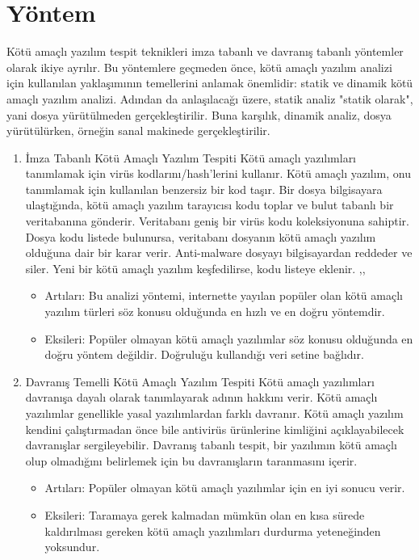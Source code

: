 \documentclass{article}
\begin{document}
\section{Yöntem}
Kötü amaçlı yazılım tespit teknikleri imza tabanlı ve davranış tabanlı yöntemler olarak ikiye ayrılır. Bu yöntemlere geçmeden önce, kötü amaçlı yazılım analizi için kullanılan yaklaşımının temellerini anlamak önemlidir: statik ve dinamik kötü amaçlı yazılım analizi. Adından da anlaşılacağı üzere, statik analiz "statik olarak", yani dosya yürütülmeden gerçekleştirilir. Buna karşılık, dinamik analiz, dosya yürütülürken, örneğin sanal makinede  gerçekleştirilir.
\begin{enumerate}
\item İmza Tabanlı Kötü Amaçlı Yazılım Tespiti
Kötü amaçlı yazılımları tanımlamak için virüs kodlarını/hash'lerini kullanır. Kötü amaçlı yazılım, onu tanımlamak için kullanılan benzersiz bir kod taşır. Bir dosya bilgisayara ulaştığında, kötü amaçlı yazılım tarayıcısı kodu toplar ve bulut tabanlı bir veritabanına gönderir. Veritabanı geniş bir virüs kodu koleksiyonuna sahiptir. Dosya kodu listede bulunursa, veritabanı dosyanın kötü amaçlı yazılım olduğuna dair bir karar verir. Anti-malware dosyayı bilgisayardan reddeder ve siler. Yeni bir kötü amaçlı yazılım keşfedilirse, kodu listeye eklenir.
,,
\begin{itemize}
\item Artıları:
 Bu analizi yöntemi, internette yayılan popüler olan kötü amaçlı yazılım türleri söz konusu olduğunda en hızlı ve en doğru yöntemdir.
\item Eksileri:
Popüler olmayan kötü amaçlı yazılımlar söz konusu olduğunda en doğru yöntem değildir. Doğruluğu kullandığı veri setine bağlıdır.
\end{itemize}
\item Davranış Temelli Kötü Amaçlı Yazılım Tespiti
Kötü amaçlı yazılımları davranışa dayalı olarak tanımlayarak adının hakkını verir. Kötü amaçlı yazılımlar genellikle yasal yazılımlardan farklı davranır. Kötü amaçlı yazılım kendini çalıştırmadan önce bile antivirüs ürünlerine kimliğini açıklayabilecek davranışlar sergileyebilir. Davranış tabanlı tespit, bir yazılımın kötü amaçlı olup olmadığını belirlemek için bu davranışların taranmasını içerir\cite{met1}.
\begin{itemize}
\item Artıları:
Popüler olmayan kötü amaçlı yazılımlar için en iyi sonucu verir.
\item Eksileri:
Taramaya gerek kalmadan mümkün olan en kısa sürede kaldırılması gereken kötü amaçlı yazılımları durdurma yeteneğinden yoksundur.
\end{itemize}
\end{enumerate}
\end{document}
